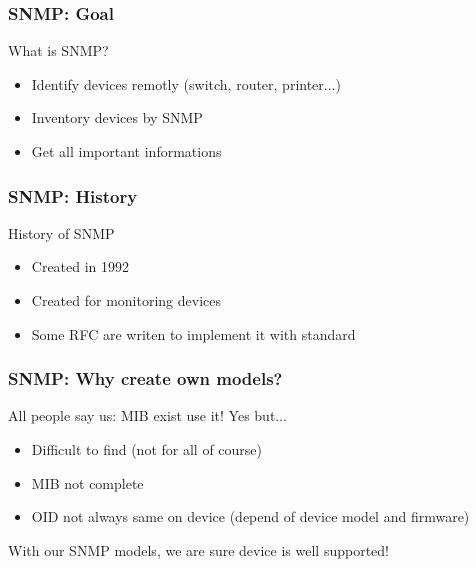 \documentclass{beamer}
\begin{document}
\begin{frame}
    \frametitle{SNMP: Goal}

    \begin{block}{What is SNMP?}
    \begin{itemize}
    \item Identify devices remotly (switch, router, printer...)
    \item Inventory devices by SNMP
    \item Get all important informations
    \end{itemize}
    \end{block}
\end{frame}

\begin{frame}
    \frametitle{SNMP: History}


    \begin{block}{History of SNMP}
    \begin{itemize}
    \item Created in 1992
    \item Created for monitoring devices
    \item Some RFC are writen to implement it with standard
    \end{itemize}
    \end{block}
\end{frame}

\begin{frame}
    \frametitle{SNMP: Why create own models?}

    \begin{block}{All people say us: MIB exist use it!}
    Yes but...
    \begin{itemize}
    \item Difficult to find (not for all of course)
    \item MIB not complete
    \item OID not always same on device (depend of device model and firmware)
    \end{itemize}
    \end{block}

    \begin{block}{With our SNMP models, we are sure device is well supported!}
    \end{block}
    
\end{frame}
\end{document}
